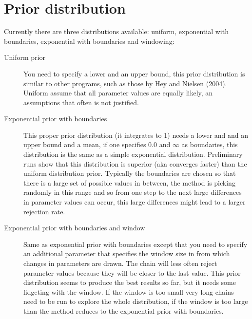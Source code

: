 \section{Prior distribution}
Currently there are three distributions available: uniform, exponential  with boundaries, 
exponential with boundaries and windowing:
\begin{description}
  \item[Uniform prior] You need to specify a lower and an upper bound, this prior distribution is similar to other programs, such as those by Hey and Nielsen (2004). Uniform assume that all parameter values are equally likely, an assumptions that often is not justified. 
  \item[Exponential prior with boundaries] This proper prior distribution (it integrates to 1) needs a lower and and an upper bound and a mean, if one specifies $0.0$ and $\infty$ as boundaries, this distribution is the same as a simple exponential distribution. Preliminary runs show that this distribution is superior (aka converges faster) than the uniform distribution prior. Typically the boundaries are chosen so that there is a large set of possible values in between, the method is picking randomly in this range and so from one step to the next large differences in parameter values can occur, this large differences might lead to a larger rejection rate.
  \item[Exponential prior with boundaries and window] Same as exponential prior with boundaries except that you need to specify an additional parameter that specifies the window size in from which changes in parameters are drawn. The chain will  less often reject parameter values because they will be closer to the last value. This prior distribution seems to produce the best results so far, but it needs some fidgeting with the window. If the window is too small very long chains need to be run to explore the whole distribution, if the window is too large than the method reduces to the exponential prior with boundaries. 
\end{description}

